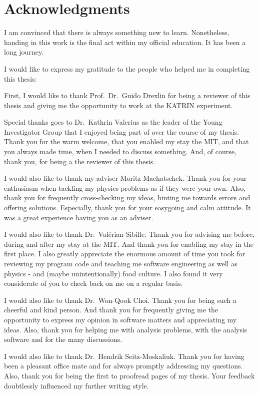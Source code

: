 \chapter*{Acknowledgments}
I am convinced that there is always something new to learn. Nonetheless, handing in this work is the final act within my official education. It has been a long journey. 

I would like to express my gratitude to the people who helped me in completing this thesis:

First, I would like to thank Prof.~Dr.~Guido Drexlin for being a reviewer of this thesis and giving me the opportunity to work at the KATRIN experiment.

Special thanks goes to Dr.~Kathrin Valerius as the leader of the Young Investigator Group that I enjoyed being part of over the course of my thesis. Thank you for the warm welcome, that you enabled my stay the MIT, and that you always made time, when I needed to discuss something. And, of course, thank you, for being a the reviewer of this thesis. 

I would also like to thank my adviser Moritz Machatschek. Thank you for your enthusiasm when tackling my physics problems as if they were your own. Also, thank you for frequently cross-checking my ideas, hinting me towards errors and offering solutions. Especially, thank you for your easygoing and calm attitude. It was a great experience having you as an adviser.

I would also like to thank Dr.~Valérian Sibille. Thank you for advising me before, during and after my stay at the MIT. And thank you for enabling my stay in the first place. I also greatly appreciate the enormous amount of time you took for reviewing my program code and teaching me software engineering as well as physics - and (maybe unintentionally) food culture. I also found it very considerate of you to check back on me on a regular basis.

I would also like to thank Dr.~Won-Qook Choi. Thank you for being such a cheerful and kind person. And thank you for frequently giving me the opportunity to express my opinion in software matters and appreciating my ideas. Also, thank you for helping me with analysis problems, with the analysis software and for the many discussions.


I would also like to thank Dr.~Hendrik Seitz-Moskaliuk. Thank you for having been a pleasant office mate and for always promptly addressing my questions. Also, thank you for being the first to proofread pages of my thesis. Your feedback doubtlessly influenced my further writing style.

